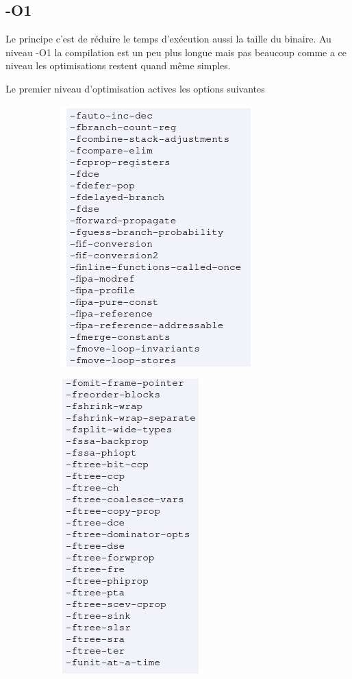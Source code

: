 \documentclass[11pt]{article} %
\begin{document}
\subsection*{-O1}
Le principe c'est de réduire le temps d'exécution aussi la taille du binaire. Au niveau -O1 la compilation est un peu plus longue mais pas beaucoup
comme a ce niveau les optimisations restent quand même simples.

Le premier niveau d'optimisation actives les options suivantes
\newpage
\begin{figure}[h!]
    \centering
    \begin{subfigure}[h!]{0.49\textwidth}
        \includegraphics[height=\linewidth]{./media/O1top}
    \end{subfigure}
    \begin{subfigure}[h!]{0.49\textwidth}
        \includegraphics[height=\linewidth]{./media/O1bot}

\end{subfigure}
\end{figure}
\end{document}
